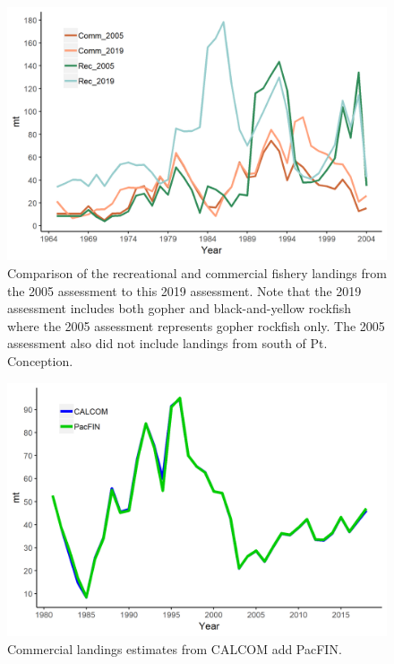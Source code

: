 \documentclass[12pt,]{article}
\begin{document}
\begin{figure}
\centering
\includegraphics{Figures/assessment_compare.png}
\caption{Comparison of the recreational and commercial fishery landings
from the 2005 assessment to this 2019 assessment. Note that the 2019
assessment includes both gopher and black-and-yellow rockfish where the
2005 assessment represents gopher rockfish only. The 2005 assessment
also did not include landings from south of Pt. Conception.
\label{fig:Assessment_compare}}
\end{figure}

\begin{figure}
\centering
\includegraphics{Figures/Calcom_vs_Pacfin.png}
\caption{Commercial landings estimates from CALCOM add PacFIN.
\label{fig:Calcom_vs_Pacfin}}
\end{figure}
\end{document}
